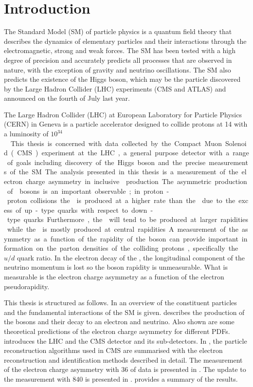 \chapter{Introduction}
\label{chap:introduction}

The Standard Model (SM) of particle physics is a quantum field theory that
describes the dynamics of elementary particles and their interactions through
the electromagnetic, strong and weak forces. The {SM} has been tested with a
high degree of precision and accurately predicts all processes that are observed
in nature, with the exception of gravity and neutrino oscillations. The {SM}
also predicts the existence of the Higgs boson, which may be the particle
discovered by the Large Hadron Collider (LHC) experiments ({CMS} and {ATLAS}) and announced on the
fourth of July last year\cite{chatrchyan2012observation,aad2012observation}.

The Large Hadron Collider (LHC) at European Laboratory for Particle Physics
(CERN) in Geneva is a particle accelerator designed to collide protons at
\unit{14}{\TeV} with a luminosity of \unit{$10^{34}$}{\lumiunits}. This thesis
is concerned with data collected by the Compact Muon Solenoid (CMS) experiment at
the {LHC}, a general purpose detector with a range of goals including discovery
of the Higgs boson and the precise measurements of the {SM}.

The analysis presented in this thesis is a measurement of the electron charge
asymmetry in inclusive \PW production. The asymmetric production of \PW bosons
is an important observable; in proton-proton collisions the \PWp is  produced at
a higher rate than the \PWm due to the excess of up-type quarks with respect to
down-type quarks. Furthermore, the \PWp will tend to be produced at larger
rapidities while the \PWm is mostly produced at central rapidities. A
measurement of the asymmetry as a function of the rapidity of the boson can
provide important information on the parton densities of the colliding protons,
specifically the ${u}/{d}$ quark ratio.  In the electron decay of the
\PW, the longitudinal component of the neutrino momentum is lost so the boson
rapidity is unmeasurable. What is measurable is the electron charge asymmetry as
a function of the electron pseudorapidity. 

This thesis is structured as follows. In  an overview of the
constituent particles  and the fundamental interactions of the {SM} is given.
 describes the production of the \PW bosons and their
decay to an electron and neutrino. Also shown are some theoretical predictions
of the electron charge asymmetry for different PDFs.  
introduces the {LHC} and the {CMS} detector and its sub-detectors.  In
, the particle reconstruction algorithms used in CMS
are summarised with the electron reconstruction and identification methods
described in detail. The measurement of the electron charge asymmetry with
\unit{36}{\invpb} of data is presented in . The update
to the measurement with \unit{840}{\invpb} is presented in
.  provides a summary of
the results.




